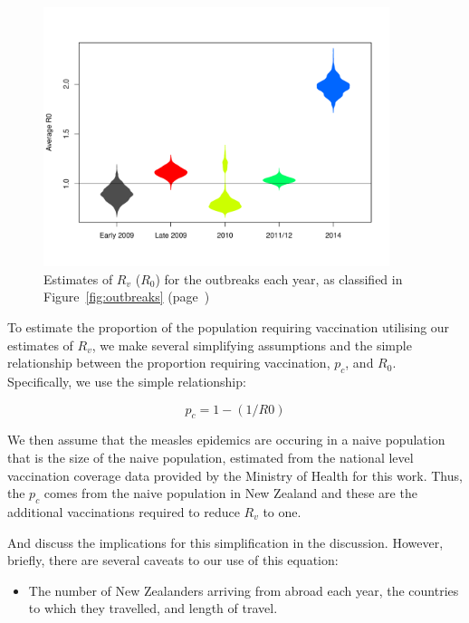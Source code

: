 \documentclass{article}
\begin{document}
\begin{figure}
     \centering
     \includegraphics[width=0.9\textwidth]{averageR0.pdf}
     \caption{Estimates of $R_v$ ($R_0$) for the outbreaks each year, as classified in Figure~\ref{fig:outbreaks} (page~\pageref{fig:outbreaks})}
     \label{fig:r0}
\end{figure}

To estimate the proportion of the population requiring vaccination utilising our estimates of $R_v$, we make several simplifying assumptions and the simple relationship between the proportion requiring vaccination, $p_c$, and $R_0$. Specifically, we use the simple relationship:

\begin{equation} \label{eq:pc}
p_c = 1-(1/R0)
  \end{equation}

We then assume that the measles epidemics are occuring in a naive population that is the size of the naive population, estimated from the national level vaccination coverage data provided by the Ministry of Health for this work. Thus, the $p_c$ comes from the naive population in New Zealand and these are the additional vaccinations required to reduce $R_v$ to one.

And discuss the implications for this simplification in the discussion. However, briefly, there are several caveats to our use of this equation:
\begin {itemize}
\item The number of New Zealanders arriving from abroad each year, the countries to which they travelled, and length of travel.
\end{itemize}
\end{document}
